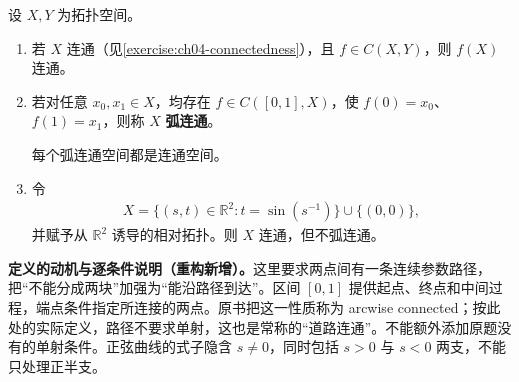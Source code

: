\documentclass[../../main.tex]{subfiles}%
\begin{document}
\begin{exercise}\label{exercise:ch04-path-connectedness}
设 $X,Y$ 为拓扑空间。
\begin{enumerate}
\item\label{item:ch04-connected-image} 若 $X$ 连通（见\cref{exercise:ch04-connectedness}），且 $f\in C(X,Y)$，则 $f(X)$ 连通。
\item\label{item:ch04-path-implies-connected}
\begin{definition*}[弧连通]\label{definition:ch04-path-connectedness}
若对任意 $x_0,x_1\in X$，均存在 $f\in C([0,1],X)$，使 $f(0)=x_0$、$f(1)=x_1$，则称 $X$ \textbf{弧连通}。
\end{definition*}
每个弧连通空间都是连通空间。
\item\label{item:ch04-sine-curve} 令
\begin{align*}
X=\{(s,t)\in\mathbb R^2:t=\sin(s^{-1})\}\cup\{(0,0)\},
\end{align*}
并赋予从 $\mathbb R^2$ 诱导的相对拓扑。则 $X$ 连通，但不弧连通。
\end{enumerate}
\end{exercise}
\begin{remark}
\textbf{定义的动机与逐条件说明（重构新增）。}这里要求两点间有一条连续参数路径，把“不能分成两块”加强为“能沿路径到达”。区间 $[0,1]$ 提供起点、终点和中间过程，端点条件指定所连接的两点。原书把这一性质称为 arcwise connected；按此处的实际定义，路径不要求单射，这也是常称的“道路连通”。不能额外添加原题没有的单射条件。正弦曲线的式子隐含 $s\ne0$，同时包括 $s>0$ 与 $s<0$ 两支，不能只处理正半支。
\end{remark}
\end{document}
